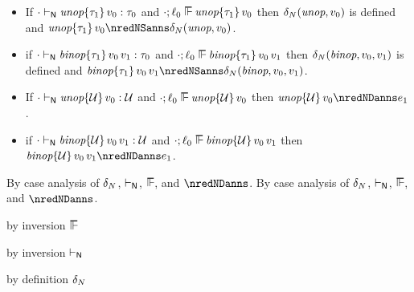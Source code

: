 \begin{lemma}\label{H-delta-label-progress}\leavevmode
  \begin{itemize}
    \item
      If\/ ${\cdot} \vdash_{\mathsf{N}} \textit{unop}{\{\tau_1\}}\,v_0 : \tau_0$
      and\/ $\snil; \sowner_0 \sWSOP \eunopt{\stype_1}{\svalue_0}$
      then\/ $\delta_{N}(\textit{unop}, v_0)$ is defined
      and\/ $\eunopt{\stype_1}{\svalue_0} \nredNSanns \sdeltaH(\sunop, \svalue_0)$.
    \item
      if\/ ${\cdot} \vdash_{\mathsf{N}} \textit{binop}{\{\tau_1\}}\,v_0\,v_1 : \tau_0$
      and\/ $\snil; \sowner_0 \sWSOP \ebinopt{\stype_1}{\svalue_0}{\svalue_1}$
      then\/ $\delta_{N}(\textit{binop}, v_0, v_1)$ is defined
      and\/ $\ebinopt{\stype_1}{\svalue_0}{\svalue_1} \nredNSanns \sdeltaH(\sbinop, \svalue_0, \svalue_1)$.
    \item
      If\/ ${\cdot} \vdash_{\mathsf{N}} \textit{unop}{\{{\mathcal U}\}}\,v_0 : {\mathcal U}$
      and\/ $\snil; \sowner_0 \sWSOP \eunopt{\tdyn}{\svalue_0}$
      then\/ $\eunopt{\tdyn}{\svalue_0} \nredNDanns \sexpr_1$.
    \item
      if\/ ${\cdot} \vdash_{\mathsf{N}} \textit{binop}{\{{\mathcal U}\}}\,v_0\,v_1 : {\mathcal U}$
      and\/ $\snil; \sowner_0 \sWSOP \ebinopt{\tdyn}{\svalue_0}{\svalue_1}$
      then\/ $\ebinopt{\tdyn}{\svalue_0}{\svalue_1} \nredNDanns \sexpr_1$.
  \end{itemize}
\end{lemma}{
  \newcommand{\shortpf}{By case analysis of $\sdeltaH$, $\sWTN$, $\sWSOP$, and $\nredNDanns$.}
\begin{lamportproof*}
  \shortpf
\mainproof
  \shortpf

    \begin{pfproof}
        \begin{pfproof}
          by inversion $\sWSOP$
        \end{pfproof}
        \begin{pfproof}
          by inversion $\vdash_{\mathsf{N}}$
        \end{pfproof}
      \qedstep
        \begin{pfproof}
          by definition $\delta_{N}$
        \end{pfproof}
    \end{pfproof}


\end{lamportproof*}}
